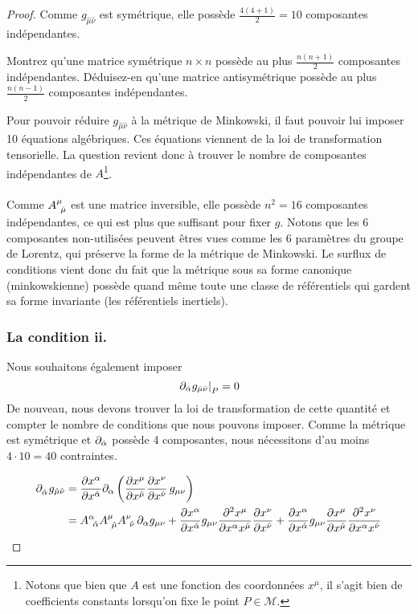 \begin{proof}
Comme $g_{\hat{\mu}\hat{\nu}}$ est symétrique, elle possède $\frac{4 (4+1)}{2} = 10$ composantes indépendantes.
\begin{exerc}
    Montrez qu'une matrice symétrique $n \times n$ possède au plus $\frac{n(n+1)}{2}$ composantes indépendantes. Déduisez-en qu'une matrice antisymétrique possède au plus $\frac{n(n-1)}{2}$ composantes indépendantes.
\end{exerc}
Pour pouvoir réduire $g_{\hat{\mu}\hat{\nu}}$ à la métrique de Minkowski, il faut pouvoir lui imposer 10 équations algébriques. Ces équations viennent de la loi de transformation tensorielle. La question revient donc à trouver le nombre de composantes indépendantes de $A$\footnote{Notons que bien que $A$ est une fonction des coordonnées $x^\mu$, il s'agit bien de coefficients constants lorsqu'on fixe le point $P\in \mathcal{M}$.}.\\
\\
Comme $A\indices{^{\mu}_{\!\hat{\mu}}}$ est une matrice inversible, elle possède $n^2 = 16$ composantes indépendantes, ce qui est plus que suffisant pour fixer $g$. Notons que les 6 composantes non-utilisées peuvent êtres vues comme les 6 paramètres du groupe de Lorentz, qui préserve la forme de la métrique de Minkowski. Le surflux de conditions vient donc du fait que la métrique sous sa forme canonique (minkowskienne) possède quand même toute une classe de référentiels qui gardent sa forme invariante (les référentiels inertiels).
\subsubsection{La condition ii.}

Nous souhaitons également imposer
\begin{equation}
    \left. \partial_{\hat{\alpha}}g_{\hat{\mu}\hat{\nu}} \right|_P =0
\end{equation}
De nouveau, nous devons trouver la loi de transformation de cette quantité et compter le nombre de conditions que nous pouvons imposer. Comme la métrique est symétrique et $\partial_{\hat{\alpha}}$ possède 4 composantes, nous nécessitons d'au moins $4\cdot 10 = 40$ contraintes.

\begin{align}
\nonumber
   \partial\indices{_{\hat{\alpha}}}g_{\hat{\mu}\hat{\nu}} &= \frac{\partial x^{\alpha}}{\partial x^{\hat{\alpha}}}\partial_{\alpha}\lt \frac{\partial x^{\mu}}{\partial x^{\hat{\mu}}}\frac{\partial x^{\nu}}{\partial x^{\hat{\nu}}} \,g_{\mu \nu} \rt\\
   \label{preuve:PE1 ii.1}
   &= A\indices{^{\alpha}_{\!\hat{\alpha}}} A\indices{^{\mu}_{\!\hat{\mu}}} A\indices{^{\nu}_{\!\hat{\nu}}}\, \partial_{\alpha} g_{\mu \nu} + \frac{\partial x^{\alpha}}{\partial x^{\hat{\alpha}}} g_{\mu \nu}\frac{\partial^2 x^{\mu}}{\partial x^{\alpha}x^{\hat{\mu}}}\frac{\partial x^{\nu}}{\partial x^{\hat{\nu}}} + \frac{\partial x^{\alpha}}{\partial x^{\hat{\alpha}}} g_{\mu \nu}\frac{\partial x^{\mu}}{\partial x^{\hat{\mu}}}\frac{\partial^2 x^{\nu}}{\partial x^{\alpha}x^{\hat{\nu}}}
\end{align}


\end{proof}
